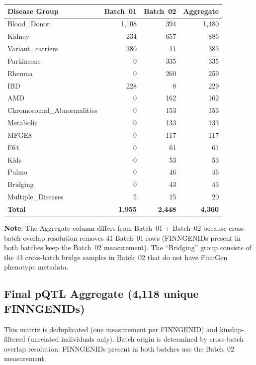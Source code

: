\documentclass[11pt,a4paper]{article}
\begin{document}
{\footnotesize
\renewcommand{\arraystretch}{1.2}
\begin{longtable}{p{4.5cm}r r r}
\toprule
\textbf{Disease Group} & \textbf{Batch~01} & \textbf{Batch~02} & \textbf{Aggregate} \\
\midrule
Blood\_Donor & 1,108 & 394 & 1,480 \\
Kidney & 234 & 657 & 886 \\
Variant\_carriers & 380 & 11 & 383 \\
Parkinsons & 0 & 335 & 335 \\
Rheuma & 0 & 260 & 259 \\
IBD & 228 & 8 & 229 \\
AMD & 0 & 162 & 162 \\
Chromosomal\_Abnormalities & 0 & 153 & 153 \\
Metabolic & 0 & 133 & 133 \\
MFGE8 & 0 & 117 & 117 \\
F64 & 0 & 61 & 61 \\
Kids & 0 & 53 & 53 \\
Pulmo & 0 & 46 & 46 \\
Bridging & 0 & 43 & 43 \\
Multiple\_Diseases & 5 & 15 & 20 \\
\textbf{Total} & \textbf{1,955} & \textbf{2,448} & \textbf{4,360} \\
\bottomrule
\end{longtable}
\renewcommand{\arraystretch}{1.0}
}

\textbf{Note}: The Aggregate column differs from Batch~01 $+$ Batch~02 because
cross-batch overlap resolution removes 41 Batch~01 rows (FINNGENIDs present
in both batches keep the Batch~02 measurement). The ``Bridging'' group
consists of the 43 cross-batch bridge samples in Batch~02 that do not have
FinnGen phenotype metadata.

\subsection{Final pQTL Aggregate (4,118 unique FINNGENIDs)}

This matrix is deduplicated (one measurement per FINNGENID) and
kinship-filtered (unrelated individuals only). Batch origin is determined by
cross-batch overlap resolution: FINNGENIDs present in both batches use the
Batch~02 measurement.
\end{document}
